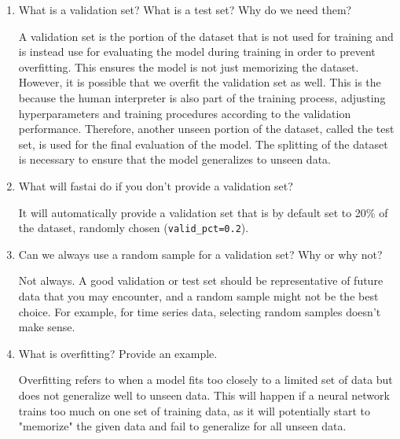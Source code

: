\documentclass[12pt,a4paper]{article}
\begin{document}
\begin{enumerate}
\bigbreak

\item What is a validation set? What is a test set? Why do we need them? \\

\smallbreak

A validation set is the portion of the dataset that is not used for training and is instead use for evaluating the model during training in order to prevent overfitting. This ensures the model is not just memorizing the dataset. \\
\smallbreak
However, it is possible that we overfit the validation set as well. This is the because the human interpreter is also part of the training process, adjusting hyperparameters and training procedures according to the validation performance. Therefore, another unseen portion of the dataset, called the test set, is used for the final evaluation of the model. The splitting of the dataset is necessary to ensure that the model generalizes to unseen data.

\bigbreak

\item What will fastai do if you don't provide a validation set? \\

\smallbreak

It will automatically provide a validation set that is by default set to 20\% of the dataset, randomly chosen (\verb/valid_pct=0.2/).

\bigbreak

\item Can we always use a random sample for a validation set? Why or why not? \\

\smallbreak

Not always. A good validation or test set should be representative of future data that you may encounter, and a random sample might not be the best choice. For example, for time series data, selecting random samples doesn't make sense.

\bigbreak

\item What is overfitting? Provide an example. \\

\smallbreak

Overfitting refers to when a model fits too closely to a limited set of data but does not generalize well to unseen data. This will happen if a neural network trains too much on one set of training data, as it will potentially start to "memorize" the given data and fail to generalize for all unseen data.


\end{enumerate}
\end{document}
